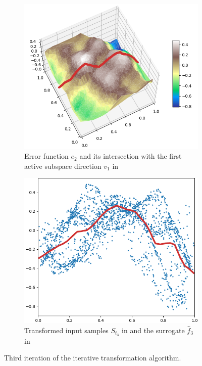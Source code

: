 \documentclass[
  a4paper,  %
  twoside,  %
  bibliography=totoc,
  headsepline,
  cleardoublepage=empty,
  parskip=half,
  draft=false
]{scrbook}
\begin{document}
\begin{mdframed}[style=style]
\begin{figure}[H]
\begin{subfigure}{.5\textwidth}
  \centering
  \includegraphics[width=.75\linewidth]{graphics/pipeline_current_3.png}
  \caption{Error function $e_2$ and its intersection with the first active subspace direction $v_1$ in \reddot}
\end{subfigure}%
\begin{subfigure}{.5\textwidth}
  \centering
  \includegraphics[width=.75\linewidth]{graphics/pipeline_local_3.png}
  \caption{Transformed input samples $S_{t_3}$ in \blue and the surrogate $\hat{f}_3$ in \reddot}
\end{subfigure}
\delimit
\caption{Third iteration of the iterative transformation algorithm.}
\label{fig:pipeline_3}
\end{figure}
\end{mdframed}
\end{document}
